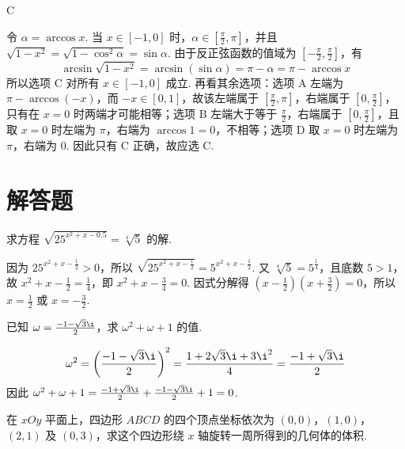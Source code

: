\begin{answer}
C
\end{answer}

\begin{solution}
令 \(\alpha=\arccos x\). 当 \(x\in[-1,0]\) 时，\(\alpha\in[\frac{\pi}{2},\pi]\)，并且 \(\sqrt{1-x^2}=\sqrt{1-\cos^2\alpha}=\sin\alpha\). 由于反正弦函数的值域为 \([-\frac{\pi}{2},\frac{\pi}{2}]\)，有
\[
\arcsin\sqrt{1-x^2}=\arcsin(\sin\alpha)=\pi-\alpha=\pi-\arccos x
\]
所以选项 C 对所有 \(x\in[-1,0]\) 成立. 再看其余选项：选项 A 左端为 \(\pi-\arccos(-x)\)，而 \(-x\in[0,1]\)，故该左端属于 \([\frac{\pi}{2},\pi]\)，右端属于 \([0,\frac{\pi}{2}]\)，只有在 \(x=0\) 时两端才可能相等；选项 B 左端大于等于 \(\frac{\pi}{2}\)，右端属于 \([0,\frac{\pi}{2}]\)，且取 \(x=0\) 时左端为 \(\pi\)，右端为 \(\arccos 1=0\)，不相等；选项 D 取 \(x=0\) 时左端为 \(\pi\)，右端为 \(0\). 因此只有 C 正确，故应选 C.
\end{solution}

\section{解答题}

\begin{problem}

求方程 \(\sqrt{25^{x^2 + x - 0.5}} = \sqrt[4]{5}\) 的解.
\end{problem}

\begin{solution}
因为 \(25^{x^2+x-\frac{1}{2}}>0\)，所以
\(\sqrt{25^{x^2+x-\frac{1}{2}}}=5^{x^2+x-\frac{1}{2}}\).
又 \(\sqrt[4]{5}=5^{\frac{1}{4}}\)，且底数 \(5>1\)，故
\(x^2+x-\frac{1}{2}=\frac{1}{4}\)，即 \(x^2+x-\frac{3}{4}=0\). 因式分解得 \(\left(x-\frac{1}{2}\right)\left(x+\frac{3}{2}\right)=0\)，所以 \(x=\frac{1}{2}\) 或 \(x=-\frac{3}{2}\).
\end{solution}

\begin{problem}

已知 \(\omega = \frac{-1 - \sqrt{3}\i}{2}\)，求 \(\omega^2 + \omega + 1\) 的值.
\end{problem}

\begin{solution}
\[
\omega^2=\left(\frac{-1-\sqrt{3}\i}{2}\right)^2
=\frac{1+2\sqrt{3}\i+3\i^2}{4}
=\frac{-1+\sqrt{3}\i}{2}
\]
因此 \(\omega^2+\omega+1=\frac{-1+\sqrt{3}\i}{2}+\frac{-1-\sqrt{3}\i}{2}+1=0\).
\end{solution}

\begin{problem}

在 \(xOy\) 平面上，四边形 \(ABCD\) 的四个顶点坐标依次为 \((0,0)\)，\((1,0)\)，\((2,1)\) 及 \((0,3)\)，求这个四边形绕 \(x\) 轴旋转一周所得到的几何体的体积.
\end{problem}

